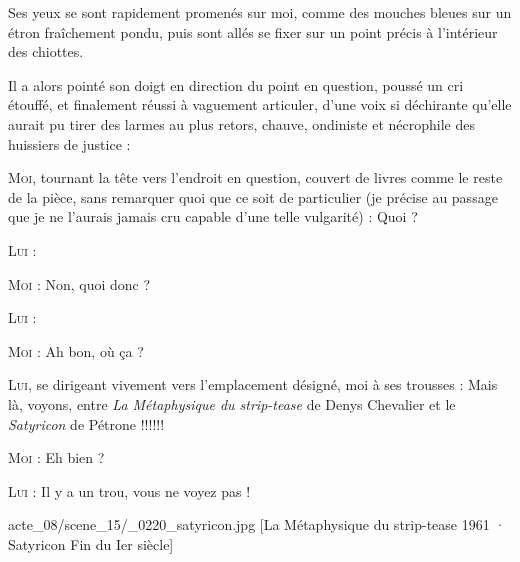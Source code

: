 Ses yeux se sont rapidement promenés sur moi, comme des mouches bleues sur un étron fraîchement pondu, puis sont allés se fixer sur un point précis à l’intérieur des chiottes.

Il a alors pointé son doigt en direction du point en question, poussé un cri étouffé, et finalement réussi à vaguement articuler, d’une voix si déchirante qu’elle aurait pu tirer des larmes au plus retors, chauve, ondiniste et nécrophile des huissiers de justice : 

\begin{dialogue}
    
\textsc{Moi}, tournant la tête vers l’endroit en question, couvert de livres comme le reste de la pièce, sans remarquer quoi que ce soit de particulier (je précise au passage que je ne l’aurais jamais cru capable d’une telle vulgarité) : Quoi ?

\textsc{Lui} : 

\textsc{Moi} : Non, quoi donc ?

\textsc{Lui} : 

\textsc{Moi} : Ah bon, où ça ?

\textsc{Lui}, se dirigeant vivement vers l’emplacement désigné, moi à ses trous\-ses : Mais là, voyons, entre \textit{La Métaphysique du strip-tease} de Denys Chevalier et le \textit{Satyricon} de Pétrone !!!!!!

\textsc{Moi} : Eh bien ?

\textsc{Lui} : Il y a un trou, vous ne voyez pas !

%
%
%
{acte_08/scene_15/_0220_satyricon.jpg}%
[La Métaphysique du strip-tease \textup{1961} · Satyricon \textup{Fin du Ier siècle}]%


\end{dialogue}
